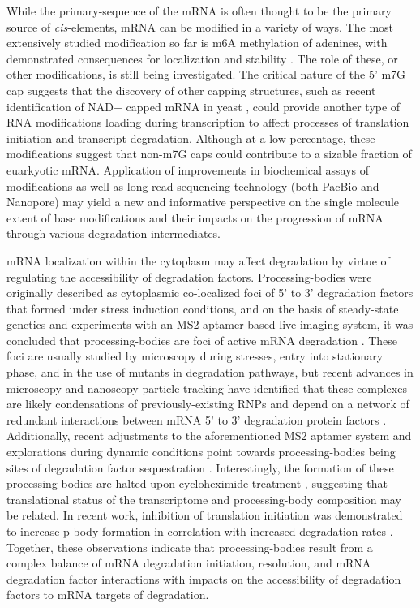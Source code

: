 While the primary-sequence of the mRNA is often thought to be the
primary source of \textit{cis}-elements,
mRNA can be modified in a variety of ways.
The most extensively studied modification so far is m6A methylation of
adenines, with demonstrated consequences for localization and
stability \parencite{gilbert2016messenger}.
The role of these, or other modifications, is still being
investigated.
The critical nature of the 5' m7G cap suggests that the
discovery of other capping structures, such as recent identification
of NAD+ capped mRNA in yeast \parencite{walters2017identification},
could provide another type of RNA modifications loading during
transcription to affect processes of translation initiation and 
transcript degradation.
Although at a low percentage, these modifications suggest that non-m7G
caps could contribute to a sizable fraction of euarkyotic mRNA.
Application of improvements in biochemical assays of modifications as
well as long-read sequencing technology (both PacBio and 
Nanopore) may yield a new and informative perspective on the single
molecule extent of base modifications and their impacts on the
progression of mRNA through various degradation intermediates.

mRNA
localization within the cytoplasm may affect degradation by virtue of
regulating the accessibility of degradation factors. Processing-bodies
were originally described as cytoplasmic co-localized foci of 5' to 3'
degradation factors that formed under stress induction conditions, and
on the basis of steady-state genetics and experiments with an MS2
aptamer-based live-imaging system, it was concluded that
processing-bodies are foci of active mRNA degradation 
\parencite{sheth2003decapping}.
These foci are usually studied by microscopy during
stresses, entry into stationary phase, and in the use of mutants in
degradation pathways, but recent advances in microscopy and nanoscopy
particle tracking have identified that these complexes are likely
condensations of previously-existing RNPs and depend on a network of
redundant interactions between mRNA 5' to 3' degradation protein
factors 
\parencite{lui2014granules,rao2017numerous}.
Additionally, recent
adjustments to the aforementioned MS2 aptamer system and explorations
during dynamic conditions point towards processing-bodies being sites
of degradation factor sequestration 
\parencite{huch2017mrna,tutucci2017improved}.
Interestingly, the formation of these processing-bodies are
halted upon cycloheximide treatment 
\parencite{sheth2003decapping},
suggesting that translational status of the transcriptome and
processing-body composition may be related. In recent work, inhibition
of translation initiation was demonstrated to increase p-body
formation in correlation with increased degradation rates 
\parencite{chan2017non}. 
Together, these observations indicate that processing-bodies
result from a complex balance of mRNA degradation initiation,
resolution, and mRNA degradation factor interactions with impacts on
the accessibility of degradation factors to mRNA targets of
degradation.  

